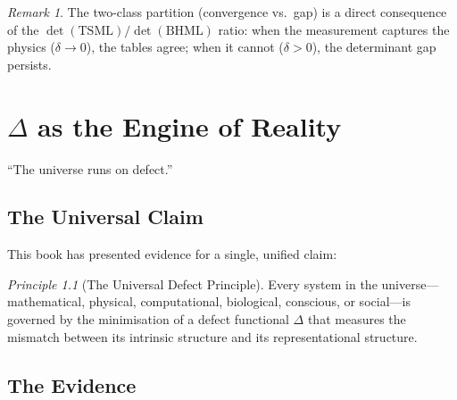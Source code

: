 \documentclass[12pt, openany]{book}
\theoremstyle{remark}
\newtheorem{remark}[theorem]{Remark}
\newtheorem{principle}[theorem]{Principle}
\begin{document}
\begin{remark}
The two-class partition (convergence vs.\ gap) is a direct consequence of the
$\det(\mathrm{TSML})/\det(\mathrm{BHML})$ ratio: when the measurement captures
the physics ($\delta \to 0$), the tables agree; when it cannot ($\delta > 0$),
the determinant gap persists.
\end{remark}


\chapter{$\Delta$ as the Engine of Reality}
\label{ch:reality}

\epigraph{``The universe runs on defect.''}{}

\section{The Universal Claim}

This book has presented evidence for a single, unified claim:

\begin{principle}[The Universal Defect Principle]
\label{prin:universal}
Every system in the universe---mathematical, physical, computational, biological,
conscious, or social---is governed by the minimisation of a defect functional
$\Delta$ that measures the mismatch between its intrinsic structure and its
representational structure.
\end{principle}

\section{The Evidence}
\end{document}
